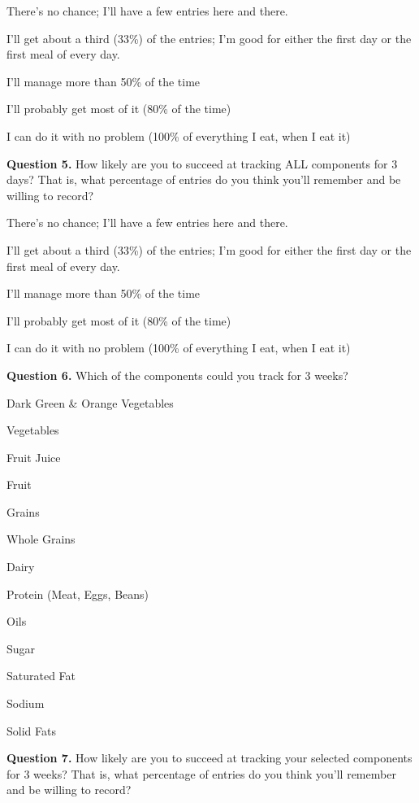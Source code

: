 \begin{itemize*}
\item	There's no chance; I'll have a few entries here and there.
\item	I'll get about a third (33\%) of the entries; I'm good for either the first day or the first meal of every day.
\item	I'll manage more than 50\% of the time
\item	I'll probably get most of it (80\% of the time)
\item	I can do it with no problem (100\% of everything I eat, when I eat it)
\end{itemize*}
\noindent\textbf{Question 5.}
How likely are you to succeed at tracking ALL components for 3 days? That is, what percentage of entries do you think you'll remember and be willing to record? 

\begin{itemize*}
\item	There's no chance; I'll have a few entries here and there.
\item	I'll get about a third (33\%) of the entries; I'm good for either the first day or the first meal of every day.
\item	I'll manage more than 50\% of the time
\item	I'll probably get most of it (80\% of the time)
\item	I can do it with no problem (100\% of everything I eat, when I eat it)
\end{itemize*}

\noindent\textbf{Question 6.}
Which of the components could you track for 3 weeks? 

\begin{itemize*}
\item	Dark Green \& Orange Vegetables
\item	Vegetables
\item	Fruit Juice
\item	Fruit
\item	Grains
\item	Whole Grains
\item	Dairy
\item	Protein (Meat, Eggs, Beans)
\item	Oils
\item	Sugar
\item	Saturated Fat
\item	Sodium
\item	Solid Fats
\end{itemize*}
\noindent\textbf{Question 7.}
How likely are you to succeed at tracking your selected components for 3 weeks? That is, what percentage of entries do you think you'll remember and be willing to record? 

